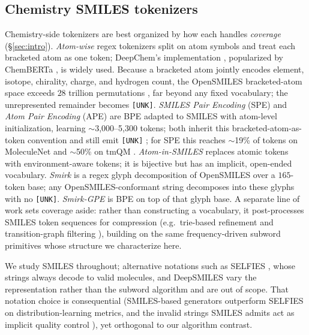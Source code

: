 \documentclass{article}
\begin{document}
\subsection{Chemistry SMILES tokenizers}\label{ssec:landscape}

Chemistry-side tokenizers are best organized by how each handles
\emph{coverage} (\S\ref{sec:intro}). \emph{Atom-wise}
regex tokenizers \citep{schwaller2018found} split on atom symbols and
treat each bracketed atom as one token; DeepChem's implementation
\citep{ramsundar2019deepchem}, popularized by ChemBERTa
\citep{chithrananda2020chemberta}, is widely used. Because a
bracketed atom jointly encodes element, isotope, chirality, charge, and
hydrogen count, the OpenSMILES bracketed-atom space exceeds $28$ trillion
permutations \citep{wadell2026smirk}, far beyond any fixed vocabulary; the
unrepresented remainder becomes \texttt{[UNK]}. \emph{SMILES Pair Encoding} (SPE)
\citep{li2021smiles-pe} and \emph{Atom Pair Encoding} (APE)
\citep{leon2024smiles-selfies-tokenization-chemical-lm} are BPE adapted
to SMILES with atom-level initialization, learning $\sim$3{,}000--5{,}300
tokens; both inherit this bracketed-atom-as-token
convention and still emit \texttt{[UNK]} \citep{wadell2026smirk}; for SPE this
reaches $\sim$19\% of tokens on MoleculeNet \citep{moleculenet} and $\sim$50\% on
tmQM \citep{balcells2020tmqm}. \emph{Atom-in-SMILES}
\citep{ucak2023atom-in-smiles} replaces atomic tokens with
environment-aware tokens; it is bijective but has an implicit,
open-ended vocabulary. \emph{Smirk} \citep{wadell2026smirk} is a regex
glyph decomposition of OpenSMILES over a $165$-token base; any
OpenSMILES-conformant string decomposes into these glyphs with no
\texttt{[UNK]}. \emph{Smirk-GPE} is BPE on top of that glyph base. A separate
line of work sets coverage aside: rather than constructing a vocabulary, it
post-processes SMILES token sequences for compression (e.g.\ trie-based
refinement and transition-graph filtering \citep{radhakrishnan2026optimizing}),
building on the same frequency-driven subword primitives whose structure we
characterize here.

We study SMILES throughout; alternative notations such as SELFIES
\citep{krenn2020selfies}, whose strings always decode to valid molecules, and
DeepSMILES \citep{oboyle2018deepsmiles} vary the
representation rather than the subword algorithm and are out of scope. That notation
choice is consequential (SMILES-based generators outperform SELFIES on
distribution-learning metrics, and the invalid strings SMILES admits act as
implicit quality control \citep{skinnider2024invalid-smiles}), yet orthogonal
to our algorithm contrast.
\end{document}

